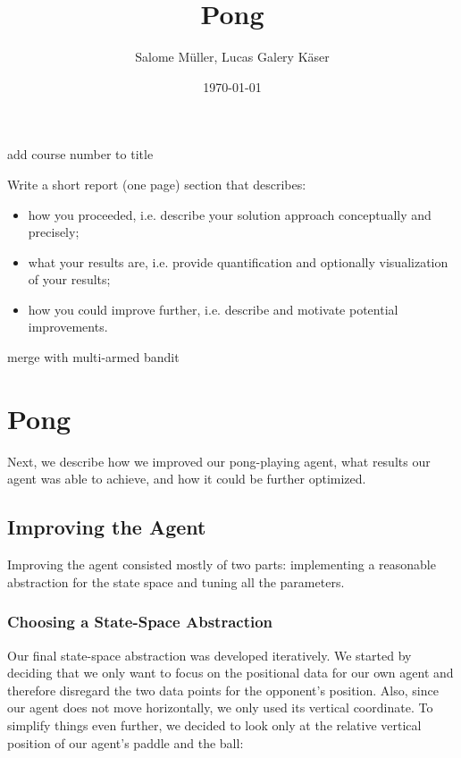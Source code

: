 \documentclass[10pt]{article}
\title{Pong}
\author{Salome Müller, Lucas Galery Käser}
\date{\today}
\newcommand{\todo}[1]{{\color{red}#1}}
\begin{document}
    \maketitle

    \todo{add course number to title}

    \todo{
    Write a short report (one page) section that describes:
    \begin{itemize}
        \item how you proceeded, i.e. describe your solution approach conceptually and precisely;\\
        \item what your results are, i.e. provide quantification and optionally visualization of your results;\\
        \item how you could improve further, i.e. describe and motivate potential improvements.\\
    \end{itemize}

    }

    \todo{merge with multi-armed bandit}

    \pagebreak


    \section{Pong}\label{sec:pong}
    Next, we describe how we improved our pong-playing agent, what results our agent was able to achieve, and how it could be further optimized.

    \subsection{Improving the Agent}\label{subsec:improving-the-agent}
    Improving the agent consisted mostly of two parts: implementing a reasonable abstraction for the state space and tuning all the parameters.

    \subsubsection{Choosing a State-Space Abstraction}
    Our final state-space abstraction was developed iteratively.
    We started by deciding that we only want to focus on the positional data for our own agent and therefore disregard the two data points for the opponent's position.
    Also, since our agent does not move horizontally, we only used its vertical coordinate.
    To simplify things even further, we decided to look only at the relative vertical position of our agent's paddle and the ball:
\end{document}
